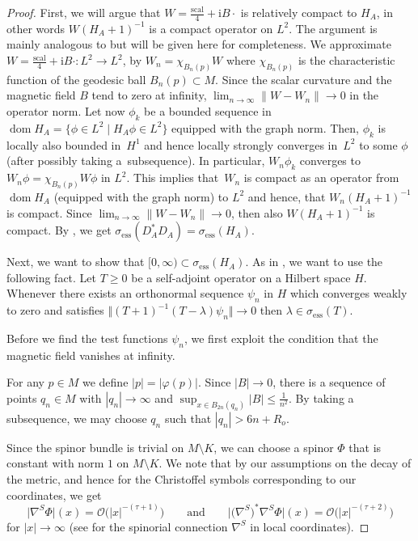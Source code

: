 \documentclass[pdftex]{sigma}
\numberwithin{equation}{section}
\begin{document}
\begin{proof}First, we will argue that $W=\frac{\mathrm{scal}}{4}+{\mathrm{i}}B\cdot $ is relatively compact to $H_A$, in other words $W(H_A+1)^{-1}$ is a compact operator on $L^2$. The argument is mainly analogous to \cite[Example~6, p.~117 and Problem 41, p.~369]{RS4} but will be given here for completeness. We approximate $W=\frac{\mathrm{scal}}{4}+{\mathrm{i}}B\cdot\colon L^2\to L^2$, by $W_n = \chi_{B_n(p)} W$ where $\chi_{B_n(p)}$ is the characteristic function of the geodesic ball $B_n(p)\subset M$. Since the scalar curvature and the magnetic field $B$ tend to zero at infinity, $\lim_{n\to \infty} \|W- W_n\| \to 0$ in the operator norm. Let now $\phi_k$ be a bounded sequence in $\operatorname{dom} H_A=\{\phi\in L^2\mid H_A\phi\in L^2\}$ equipped with the graph norm. Then, $\phi_k$ is locally also bounded in~$H^1$ and hence locally strongly converges in~$L^2$ to some $\phi$ (after possibly taking a~subsequence). In particular, $W_n\phi_k$ converges to $W_n \phi=\chi_{B_n(p)} W \phi$ in $L^2$. This implies that~$W_n$ is compact as an operator from $\operatorname{dom}H_A$ (equipped with the graph norm) to $L^2$ and hence, that $W_n(H_A+1)^{-1}$ is compact. Since $\lim_{n\to \infty} \|W- W_n\| \to 0$, then also $W(H_A+1)^{-1}$ is compact. By \cite[Corollary 2, p.~113]{RS4}, we get $\sigma_{\text{ess}} (D_A^*D_A) = \sigma_{\text{ess}} (H_A)$.
	
Next, we want to show that $[0, \infty)\subset \sigma_{\text{ess}} (H_A)$. As in \cite[Step~3, p.~117]{CFKS}, we want to use the following fact. Let $T\geq 0$ be a self-adjoint operator on a Hilbert space $H$. Whenever there exists an orthonormal sequence $\psi_n$ in $H$ which converges weakly to zero and satisfies $\bigl\Vert (T+1)^{-1}(T-\lambda)\psi_n\bigr\Vert\to 0$ then $\lambda\in \sigma_{\text{ess}}(T)$.
		
Before we find the test functions $\psi_n$, we first exploit the condition that the magnetic field vanishes at infinity.
	
For any $p \in M$ we define $|p|=|\varphi(p)|$. Since $|B|\to 0$, there is a sequence of points $q_n\in M$ with $|q_n|\to \infty$ and $\sup_{x\in B_{2n}(q_n)} |B|\leq \frac{1}{n^2}$. By taking a subsequence, we may choose $q_n$ such that $|q_n|> 6n+R_o$.
	
Since the spinor bundle is trivial on $M\setminus K$, we can choose a spinor $\Phi$ that is constant with norm $1$ on $M\setminus K$. We note that by our assumptions on the decay of the metric, and hence for the Christoffel symbols corresponding to our coordinates, we get
\[\bigl| {\nabla}^S \Phi\bigr|(x)=\mathcal{O}\bigl(|x|^{-(\tau+1)}\bigr)\qquad \text{and}\qquad\bigl|\bigl(\nabla^S\bigr)^*\nabla^S \Phi\bigr|(x)= \mathcal{O}\bigl(|x|^{-(\tau+2)}\bigr)\] for $|x|\to \infty$ (see \cite[Section~4]{LM} for the spinorial connection $\nabla^S$ in local coordinates).
	

\end{proof}
\end{document}
